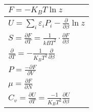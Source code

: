\begin{table}[H]
	\centering
	\begin{tabular}{|p{3.5cm}|}
		\hline
	$F=-K_{B} T \ln z$\\\hline
	$U=\sum_{i} \varepsilon_{i} P_{i}-\frac{\partial}{\partial \beta} \ln z$\\\hline
	$S =\frac{\partial F}{\partial T} =\frac{1}{k B T^{2}} \cdot \frac{\partial F}{\partial \beta}$\\
	$\frac{\partial}{\partial T}=-\frac{1}{K_{B} T^{2}} \frac{\partial}{\partial \beta}$\\\hline
	$P=\frac{-\partial F}{\partial V}$	\\\hline
	$\mu= \frac{\partial F}{\partial N}$\\\hline	
	$C_{v}=\frac{\partial U}{\partial T}=\frac{-1}{K_{B} T^{2}} \frac{\partial U}{\partial \beta}$	\\\hline
	\end{tabular}
\end{table}





